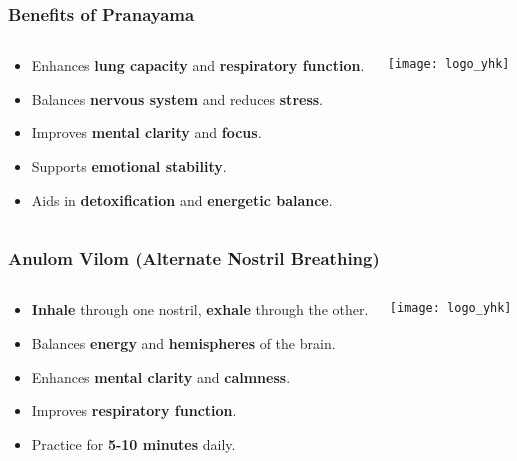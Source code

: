 \begin{frame}[fragile]\frametitle{Benefits of Pranayama}
\begin{columns}
    \begin{column}[T]{0.5\linewidth}
      \begin{itemize}
        \item Enhances \textbf{lung capacity} and \textbf{respiratory function}.
        \item Balances \textbf{nervous system} and reduces \textbf{stress}.
        \item Improves \textbf{mental clarity} and \textbf{focus}.
        \item Supports \textbf{emotional stability}.
        \item Aids in \textbf{detoxification} and \textbf{energetic balance}.
      \end{itemize}
    \end{column}
    \begin{column}[T]{0.5\linewidth}
        \begin{center}
        \texttt{[image: logo\_yhk]}
        \end{center}	
    \end{column}
\end{columns}
\end{frame}

\begin{frame}[fragile]\frametitle{Anulom Vilom (Alternate Nostril Breathing)}
\begin{columns}
    \begin{column}[T]{0.5\linewidth}
      \begin{itemize}
        \item \textbf{Inhale} through one nostril, \textbf{exhale} through the other.
        \item Balances \textbf{energy} and \textbf{hemispheres} of the brain.
        \item Enhances \textbf{mental clarity} and \textbf{calmness}.
        \item Improves \textbf{respiratory function}.
        \item Practice for \textbf{5-10 minutes} daily.
      \end{itemize}
    \end{column}
    \begin{column}[T]{0.5\linewidth}
        \begin{center}
        \texttt{[image: logo\_yhk]}
        \end{center}	
    \end{column}
\end{columns}
\end{frame}

